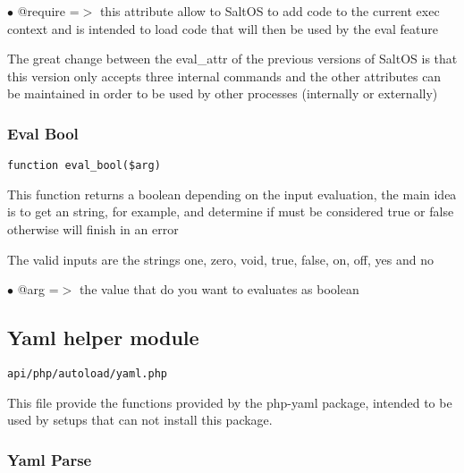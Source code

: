 \documentclass[a4paper]{article}
\begin{document}
\begin{compactitem}
\item[\color{myblue}$\bullet$] @require =$>$ this attribute allow to SaltOS to add code to the current exec
context and is intended to load code that will then be used by the eval feature
\end{compactitem}

The great change between the eval\_attr of the previous versions of SaltOS is
that this version only accepts three internal commands and the other
attributes can be maintained in order to be used by other processes
(internally or externally)

\hypertarget{toc284}{}
\subsubsection{Eval Bool}

\begin{lstlisting}
function eval_bool($arg)
\end{lstlisting}

This function returns a boolean depending on the input evaluation, the main idea
is to get an string, for example, and determine if must be considered true or false
otherwise will finish in an error

The valid inputs are the strings one, zero, void, true, false, on, off, yes and no

\begin{compactitem}
\item[\color{myblue}$\bullet$] @arg =$>$ the value that do you want to evaluates as boolean
\end{compactitem}

\hypertarget{toc285}{}
\subsection{Yaml helper module}

\begin{lstlisting}
api/php/autoload/yaml.php
\end{lstlisting}

This file provide the functions provided by the php-yaml package, intended
to be used by setups that can not install this package.

\hypertarget{toc286}{}
\subsubsection{Yaml Parse}
\end{document}
